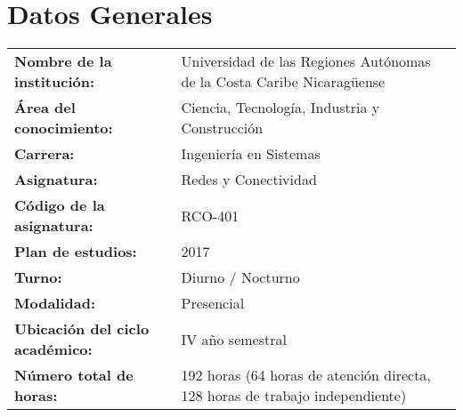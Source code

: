 \section*{Datos Generales}

\vspace{0.8cm}

\begin{center}
	\begin{tabular}{p{7.5cm} p{8cm}}
		\large \textbf{Nombre de la institución:}      & \large Universidad de las Regiones Autónomas de la Costa Caribe Nicaragüense\vspace{0.5cm}         \\
		\large \textbf{Área del conocimiento:}         & \large Ciencia, Tecnología, Industria y Construcción\vspace{0.5cm}                                 \\
		\large \textbf{Carrera:}                       & \large Ingeniería en Sistemas\vspace{0.5cm}                                                        \\
		\large \textbf{Asignatura:}                    & \large Redes y Conectividad\vspace{0.5cm}                                                          \\
		\large \textbf{Código de la asignatura:}       & \large RCO-401\vspace{0.5cm}                                                                       \\
		\large \textbf{Plan de estudios:}              & \large 2017\vspace{0.5cm}                                                                          \\
		\large \textbf{Turno:}                         & \large Diurno / Nocturno\vspace{0.5cm}                                                             \\
		\large \textbf{Modalidad:}                     & \large Presencial\vspace{0.5cm}                                                                    \\
		\large \textbf{Ubicación del ciclo académico:} & \large IV año semestral\vspace{0.5cm}                                                              \\
		\large \textbf{Número total de horas:}         & \large 192 horas (64 horas de atención directa, 128 horas de trabajo independiente) \vspace{0.5cm} \\

\end{tabular}
\end{center}
